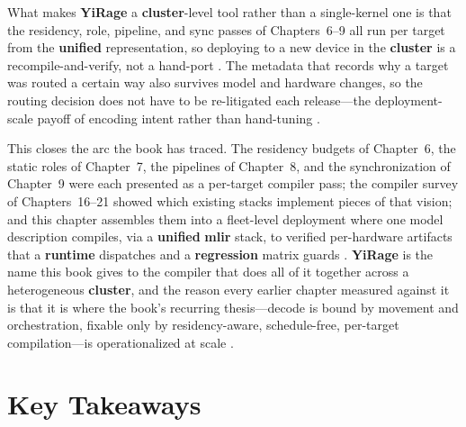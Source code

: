 What makes \textbf{YiRage} a \textbf{cluster}-level tool rather than a single-kernel one is that the residency, role, pipeline, and sync passes of Chapters~6--9 all run per target from the \textbf{unified} representation, so deploying to a new device in the \textbf{cluster} is a recompile-and-verify, not a hand-port \citep{yirage2026,wu2024mirage}. The metadata that records why a target was routed a certain way also survives model and hardware changes, so the routing decision does not have to be re-litigated each release---the deployment-scale payoff of encoding intent rather than hand-tuning \citep{patel2025llminference,memoryfloor2026}.

This closes the arc the book has traced. The residency budgets of Chapter~6, the static roles of Chapter~7, the pipelines of Chapter~8, and the synchronization of Chapter~9 were each presented as a per-target compiler pass; the compiler survey of Chapters~16--21 showed which existing stacks implement pieces of that vision; and this chapter assembles them into a fleet-level deployment where one model description compiles, via a \textbf{unified} \textbf{mlir} stack, to verified per-hardware artifacts that a \textbf{runtime} dispatches and a \textbf{regression} matrix guards \citep{yirage2026,iree2024,wu2024mirage}. \textbf{YiRage} is the name this book gives to the compiler that does all of it together across a heterogeneous \textbf{cluster}, and the reason every earlier chapter measured against it is that it is where the book's recurring thesis---decode is bound by movement and orchestration, fixable only by residency-aware, schedule-free, per-target compilation---is operationalized at scale \citep{taxbreak2026,mpk2025}.

\section{Key Takeaways}
\label{sec:ch24_key_takeaways}

